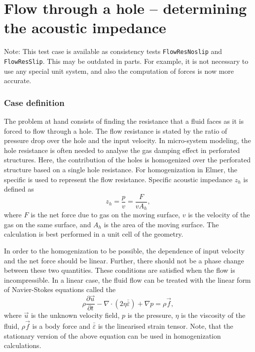 \chapter{Flow through a hole -- determining the acoustic impedance} 


\noindent
Note: This test case is available as consistency tests 
\texttt{FlowResNoslip} and \texttt{FlowResSlip}. This may be outdated
in parts. For example, it is not necessary to use any special unit system,
and also the computation of forces is now more accurate.

\subsection*{Case definition}

The problem at hand consists of finding the resistance that a fluid
faces as it is forced to flow through a hole. The flow resistance is
stated by the ratio of pressure drop over the hole and the input
velocity. In micro-system modeling, the hole resistance is often needed
to analyse the gas damping effect in perforated structures. Here, the
contribution of the holes is homogenized over the perforated structure
based on a single hole resistance. For homogenization in Elmer, the
specific  is used to represent the flow
resistance. Specific acoustic impedance $z_h$ is defined as
\begin{equation}
z_h = \frac{p}{v} = \frac{F}{vA_h},
\end{equation}
where $F$ is the net force due to gas on the moving surface, $v$ is
the velocity of the gas on the same surface, and $A_h$ is the area of
the moving surface. The calculation is best performed in a unit cell
of the geometry.

In order to the homogenization to be possible, the dependence of input
velocity and the net force should be linear. Further, there should not
be a phase change between these two quantities. These conditions are
satisfied when the flow is incompressible.  In a linear case, the
fluid flow can be treated with the linear form of Navier-Stokes
equations called the 
\begin{equation}
\rho\frac{\partial \vec{u}}{\partial t}
-\nabla\cdot(2\eta\overline{\overline{\varepsilon}}) +\nabla p =
\rho \vec{f},
\end{equation}
where $\vec{u}$ is the unknown velocity field, $p$ is the pressure,
$\eta$ is the viscosity of the fluid, $\rho\vec{f}$ is a body force
and $\overline{\overline{\varepsilon}}$ is the linearised strain
tensor. Note, that the stationary version of the above equation can be
used in homogenization calculations.

